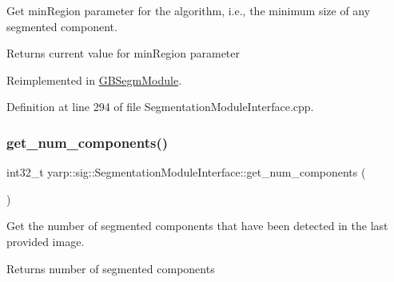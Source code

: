 Get min\+Region parameter for the algorithm, i.\+e., the minimum size of any segmented component. 

\begin{DoxyReturn}{Returns}
current value for min\+Region parameter 
\end{DoxyReturn}


Reimplemented in \hyperlink{classGBSegmModule_a2378b95e60b406a119947aa86b5bb9c4}{G\+B\+Segm\+Module}.



Definition at line 294 of file Segmentation\+Module\+Interface.\+cpp.


\mbox{\label{classyarp_1_1sig_1_1SegmentationModuleInterface_a3c6b695fbef9e6827e7dd6b4cbbc38fe}} 
\subsubsection{\texorpdfstring{get\+\_\+num\+\_\+components()}{get\_num\_components()}}
{\footnotesize\ttfamily int32\+\_\+t yarp\+::sig\+::\+Segmentation\+Module\+Interface\+::get\+\_\+num\+\_\+components (\begin{DoxyParamCaption}{ }\end{DoxyParamCaption})\hspace{0.3cm}{\ttfamily [virtual]}}



Get the number of segmented components that have been detected in the last provided image. 

\begin{DoxyReturn}{Returns}
number of segmented components 
\end{DoxyReturn}


